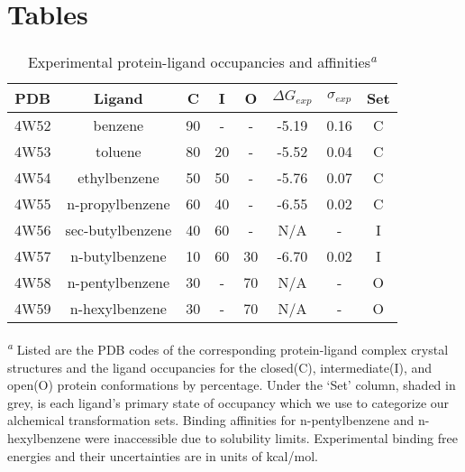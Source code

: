 \section*{Tables}

\begin{table}[!htb]
\centering
\caption{Experimental protein-ligand occupancies and affinities\textsuperscript{\emph{a}}}
\label{tbl:expdata}
\begin{tabular}{|c|c|c|c|c|c|c|c|}
\hline
\textbf{PDB}  & \textbf{Ligand} & \textbf{C} & \textbf{I} & \textbf{O} & \boldmath$\Delta G_{exp}$  & \boldmath$\sigma_{exp}$ &  \textbf{Set} \\ \hline
4W52   &  benzene          & \cellcolor[HTML]{C0C0C0}90   & -     & -    & -5.19      & 0.16       &  C             \\ \hline
4W53   &  toluene          & \cellcolor[HTML]{C0C0C0}80   & 20   & -    & -5.52      & 0.04       & C   \\ \hline
4W54   &  ethylbenzene     & \cellcolor[HTML]{C0C0C0}50    & 50   & -    & -5.76      & 0.07       & C   \\ \hline
4W55   &  n-propylbenzene  & \cellcolor[HTML]{C0C0C0}60    & 40   & -    & -6.55      & 0.02       & C   \\ \hline
4W56   &  sec-butylbenzene & 40        & \cellcolor[HTML]{C0C0C0}60      & -    & N/A      & -     &  I   \\ \hline
4W57   &  n-butylbenzene   & 10        & \cellcolor[HTML]{C0C0C0}60      & 30   & -6.70   & 0.02  &  I   \\ \hline
4W58   &  n-pentylbenzene  & 30        &  -       & \cellcolor[HTML]{C0C0C0}70  & N/A     & -      &  O   \\ \hline
4W59   &  n-hexylbenzene   & 30        &  -       & \cellcolor[HTML]{C0C0C0}70  & N/A     & -     & O   \\ \hline
\end{tabular}

\textsuperscript{\emph{a}} Listed are the PDB codes of the corresponding protein-ligand complex crystal structures and the ligand occupancies\cite{Merski2015} for the closed(C), intermediate(I), and open(O) protein conformations by percentage. 
Under the `Set' column, shaded in grey, is each ligand's primary state of occupancy which we use to categorize our alchemical transformation sets.
Binding affinities for n-pentylbenzene and n-hexylbenzene were inaccessible due to solubility limits\cite{Merski2015}. 
Experimental binding free energies and their uncertainties are in units of kcal/mol\cite{T4affinity}.
\end{table}


